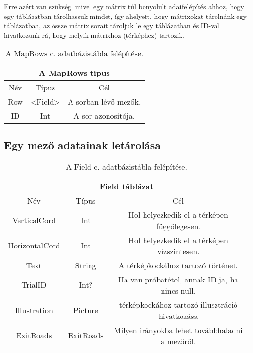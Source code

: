 Erre azért van szükség, mivel egy mátrix túl bonyolult adatfelépítés ahhoz, hogy egy táblázatban tárolhassuk mindet, így ahelyett, hogy mátrixokat tárolnánk egy táblázatban, az össze mátrix sorait tároljuk le egy táblázatban és ID-val hivatkozunk rá, hogy melyik mátrixhoz (térképhez) tartozik.
\begin{table}[H]
	\centering
	\begin{tabular}{ |c|c|c| }
		\hline
		\multicolumn{3}{|c|}{A MapRows típus}\\
		\hline
		Név & Típus & Cél \\
		\hline
		Row  & <Field>  & A sorban lévő mezők.  \\
		\hline
		ID & Int & A sor azonosítója.\\
		\hline
	\end{tabular}
	\caption[MapRows táblázat]{A MapRows c. adatbázistábla felépítése.}
	\label{tab:row}
\end{table}

\subsection{Egy mező adatainak letárolása}

\begin{table}[H]
	\centering
	\begin{tabular}{ |c|c|c| }
		\hline
		\multicolumn{3}{|c|}{Field táblázat}\\
		\hline
		Név & Típus & Cél \\
		\hline
		VerticalCord  & Int & Hol helyezkedik el a térképen függőlegesen.  \\
		\hline
		HorizontalCord & Int & Hol helyezkedik el a térképen vízszintesen.\\
		\hline
		Text & String & A térképkockához tartozó történet.\\
		\hline
		TrialID & Int? & Ha van próbatétel, annak ID-ja, ha nincs null.\\
		\hline
		Illustration & Picture & térképkockához tartozó illusztráció hivatkozása\\
		\hline
		ExitRoads & ExitRoads & Milyen irányokba lehet továbbhaladni a mezőről.\\
		\hline
	\end{tabular}
	\caption[Field adatbázistábla]{A Field c. adatbázistábla felépítése.}
	\label{tab:field}
\end{table}

